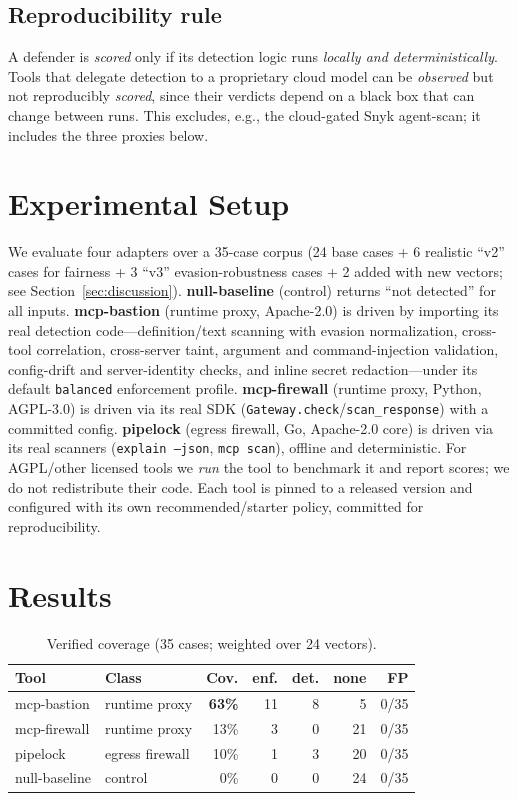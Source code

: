 \documentclass[sigconf,review]{acmart}
\begin{document}
\subsection{Reproducibility rule}\label{sec:repro}
A defender is \emph{scored} only if its detection logic runs \emph{locally and deterministically}. Tools that delegate detection to a proprietary cloud model can be \emph{observed} but not reproducibly \emph{scored}, since their verdicts depend on a black box that can change between runs. This excludes, e.g., the cloud-gated Snyk agent-scan; it includes the three proxies below.

\section{Experimental Setup}\label{sec:setup}
We evaluate four adapters over a 35-case corpus (24 base cases + 6 realistic ``v2'' cases for fairness + 3 ``v3'' evasion-robustness cases + 2 added with new vectors; see Section~\ref{sec:discussion}). \textbf{null-baseline} (control) returns ``not detected'' for all inputs. \textbf{mcp-bastion} (runtime proxy, Apache-2.0) is driven by importing its real detection code---definition/text scanning with evasion normalization, cross-tool correlation, cross-server taint, argument and command-injection validation, config-drift and server-identity checks, and inline secret redaction---under its default \texttt{balanced} enforcement profile. \textbf{mcp-firewall} (runtime proxy, Python, AGPL-3.0) is driven via its real SDK (\texttt{Gateway.check}/\texttt{scan\_response}) with a committed config. \textbf{pipelock} (egress firewall, Go, Apache-2.0 core) is driven via its real scanners (\texttt{explain --json}, \texttt{mcp scan}), offline and deterministic. For AGPL/other licensed tools we \emph{run} the tool to benchmark it and report scores; we do not redistribute their code. Each tool is pinned to a released version and configured with its own recommended/starter policy, committed for reproducibility.

\section{Results}\label{sec:results}
\begin{table}[t]
\caption{Verified coverage (35 cases; weighted over 24 vectors).}
\label{tab:results}
\small
\begin{tabular}{llrrrrr}
\toprule
Tool & Class & Cov. & enf. & det. & none & FP \\
\midrule
mcp-bastion & runtime proxy & \textbf{63\%} & 11 & 8 & 5 & 0/35 \\
mcp-firewall & runtime proxy & 13\% & 3 & 0 & 21 & 0/35 \\
pipelock & egress firewall & 10\% & 1 & 3 & 20 & 0/35 \\
null-baseline & control & 0\% & 0 & 0 & 24 & 0/35 \\
\bottomrule
\end{tabular}
\end{table}
\end{document}
